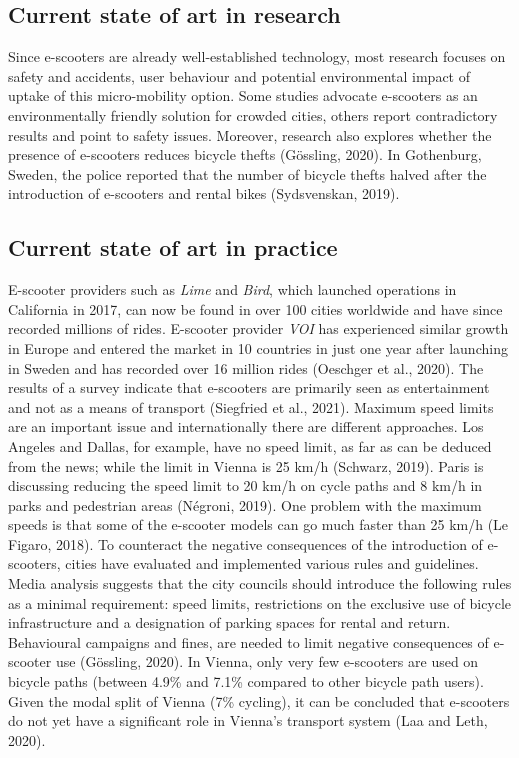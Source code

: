 \documentclass[
]{book}
\begin{document}
\hypertarget{current-state-of-art-in-research-44}{%
\subsection*{Current state of art in research}\label{current-state-of-art-in-research-44}}

Since e-scooters are already well-established technology, most research focuses on safety and accidents, user behaviour and potential environmental impact of uptake of this micro-mobility option. Some studies advocate e-scooters as an environmentally friendly solution for crowded cities, others report contradictory results and point to safety issues.
Moreover, research also explores whether the presence of e-scooters reduces bicycle thefts (Gössling, 2020). In Gothenburg, Sweden, the police reported that the number of bicycle thefts halved after the introduction of e-scooters and rental bikes (Sydsvenskan, 2019).

\hypertarget{current-state-of-art-in-practice-44}{%
\subsection*{Current state of art in practice}\label{current-state-of-art-in-practice-44}}

E-scooter providers such as \emph{Lime} and \emph{Bird}, which launched operations in California in 2017, can now be found in over 100 cities worldwide and have since recorded millions of rides. E-scooter provider \emph{VOI} has experienced similar growth in Europe and entered the market in 10 countries in just one year after launching in Sweden and has recorded over 16 million rides (Oeschger et al., 2020). The results of a survey indicate that e-scooters are primarily seen as entertainment and not as a means of transport (Siegfried et al., 2021).
Maximum speed limits are an important issue and internationally there are different approaches. Los Angeles and Dallas, for example, have no speed limit, as far as can be deduced from the news; while the limit in Vienna is 25 km/h (Schwarz, 2019). Paris is discussing reducing the speed limit to 20 km/h on cycle paths and 8 km/h in parks and pedestrian areas (Négroni, 2019). One problem with the maximum speeds is that some of the e-scooter models can go much faster than 25 km/h (Le Figaro, 2018). To counteract the negative consequences of the introduction of e-scooters, cities have evaluated and implemented various rules and guidelines. Media analysis suggests that the city councils should introduce the following rules as a minimal requirement: speed limits, restrictions on the exclusive use of bicycle infrastructure and a designation of parking spaces for rental and return. Behavioural campaigns and fines, are needed to limit negative consequences of e-scooter use (Gössling, 2020).
In Vienna, only very few e-scooters are used on bicycle paths (between 4.9\% and 7.1\% compared to other bicycle path users). Given the modal split of Vienna (7\% cycling), it can be concluded that e-scooters do not yet have a significant role in Vienna's transport system (Laa and Leth, 2020).
\end{document}

